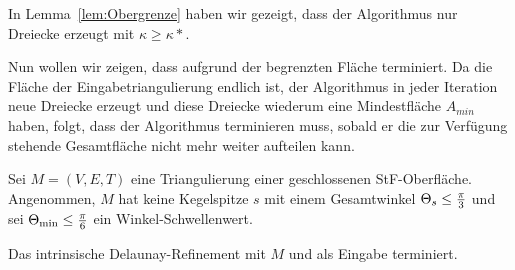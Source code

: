 In Lemma~\ref{lem:Obergrenze} haben wir gezeigt, dass der Algorithmus nur Dreiecke erzeugt mit $\kappa \geq \kappa* $.

Nun wollen wir zeigen, dass \algorithmusname aufgrund der begrenzten Fläche terminiert. Da die Fläche der Eingabetriangulierung endlich ist, der Algorithmus in jeder Iteration neue Dreiecke erzeugt und diese Dreiecke wiederum eine Mindestfläche $A_{min}$ haben, folgt, dass der Algorithmus terminieren muss, sobald er die zur Verfügung stehende Gesamtfläche nicht mehr weiter aufteilen kann.\\  



\begin{theorem}
Sei $M = (V,E,T)$ eine Triangulierung einer geschlossenen StF-Oberfläche.
Angenommen, $M$ hat keine Kegelspitze $s$ mit einem Gesamtwinkel $\gesamtwinkel*[s] \leq \frac{\pi}{3}$ und sei  $\kleinsterWinkel* \leq \frac{\pi}{6}$ ein Winkel-Schwellenwert. 


Das intrinsische Delaunay-Refinement mit $M$ und \kleinsterWinkel als Eingabe terminiert.
\end{theorem}










